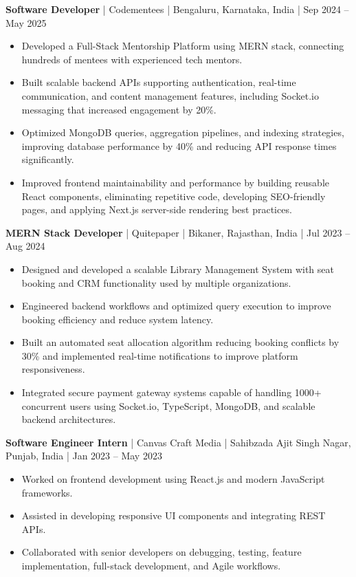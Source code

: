 \documentclass[10pt,a4paper]{article}
\begin{document}
\textbf{Software Developer} | Codementees | Bengaluru, Karnataka, India | Sep 2024 -- May 2025
\begin{itemize}
  \item Developed a Full-Stack Mentorship Platform using MERN stack, connecting hundreds of mentees with experienced tech mentors.
  \item Built scalable backend APIs supporting authentication, real-time communication, and content management features, including Socket.io messaging that increased engagement by 20\%.
  \item Optimized MongoDB queries, aggregation pipelines, and indexing strategies, improving database performance by 40\% and reducing API response times significantly.
  \item Improved frontend maintainability and performance by building reusable React components, eliminating repetitive code, developing SEO-friendly pages, and applying Next.js server-side rendering best practices.
\end{itemize}

\textbf{MERN Stack Developer} | Quitepaper | Bikaner, Rajasthan, India | Jul 2023 -- Aug 2024
\begin{itemize}
  \item Designed and developed a scalable Library Management System with seat booking and CRM functionality used by multiple organizations.
  \item Engineered backend workflows and optimized query execution to improve booking efficiency and reduce system latency.
  \item Built an automated seat allocation algorithm reducing booking conflicts by 30\% and implemented real-time notifications to improve platform responsiveness.
  \item Integrated secure payment gateway systems capable of handling 1000+ concurrent users using Socket.io, TypeScript, MongoDB, and scalable backend architectures.
\end{itemize}

\textbf{Software Engineer Intern} | Canvas Craft Media | Sahibzada Ajit Singh Nagar, Punjab, India | Jan 2023 -- May 2023
\begin{itemize}
  \item Worked on frontend development using React.js and modern JavaScript frameworks.
  \item Assisted in developing responsive UI components and integrating REST APIs.
  \item Collaborated with senior developers on debugging, testing, feature implementation, full-stack development, and Agile workflows.
\end{itemize}
\end{document}
